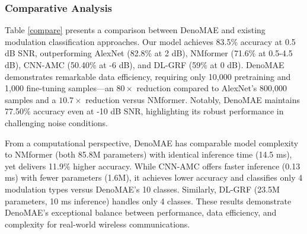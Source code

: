 \subsubsection{Comparative Analysis}

Table \ref{compare} presents a comparison between DenoMAE and existing modulation classification approaches. Our model achieves 83.5\% accuracy at 0.5 dB SNR, outperforming AlexNet (82.8\% at 2 dB), NMformer (71.6\% at 0.5-4.5 dB), CNN-AMC (50.40\% at -6 dB), and DL-GRF (59\% at 0 dB). DenoMAE demonstrates remarkable data efficiency, requiring only 10,000 pretraining and 1,000 fine-tuning samples—an $80\times$ reduction compared to AlexNet's 800,000 samples and a $10.7\times$ reduction versus NMformer. Notably, DenoMAE maintains 77.50\% accuracy even at -10 dB SNR, highlighting its robust performance in challenging noise conditions.

From a computational perspective, DenoMAE has comparable model complexity to NMformer (both 85.8M parameters) with identical inference time (14.5 ms), yet delivers 11.9\% higher accuracy. While CNN-AMC offers faster inference (0.13 ms) with fewer parameters (1.6M), it achieves lower accuracy and classifies only 4 modulation types versus DenoMAE's 10 classes. Similarly, DL-GRF (23.5M parameters, 10 ms inference) handles only 4 classes. These results demonstrate DenoMAE's exceptional balance between performance, data efficiency, and complexity for real-world wireless communications.

\begin{table}[htbp]
    \centering
    \caption{Comparison of DenoMAE with other modulation classification methods}
    \label{compare}
\end{table}

